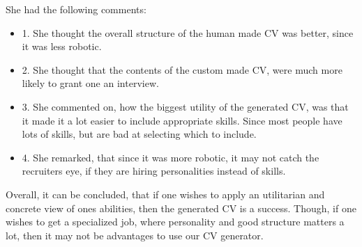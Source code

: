 She had the following comments:
\begin{itemize}
  \item 1. She thought the overall structure of the human made CV was better, since it was less robotic.
  \item 2. She thought that the contents of the custom made CV, were much more likely to grant one an interview.
  \item 3. She commented on, how the biggest utility of the generated CV, was that it made it a lot easier to include appropriate skills. Since most people have lots of skills, but are bad at selecting which to include.
  \item 4. She remarked, that since it was more robotic, it may not catch the recruiters eye, if they are hiring personalities instead of skills.
\end{itemize}

Overall, it can be concluded, that if one wishes to apply an utilitarian and concrete view of ones abilities, then the generated CV is a success.
Though, if one wishes to get a specialized job, where personality and good structure matters a lot, then it may not be advantages to use our CV generator.
